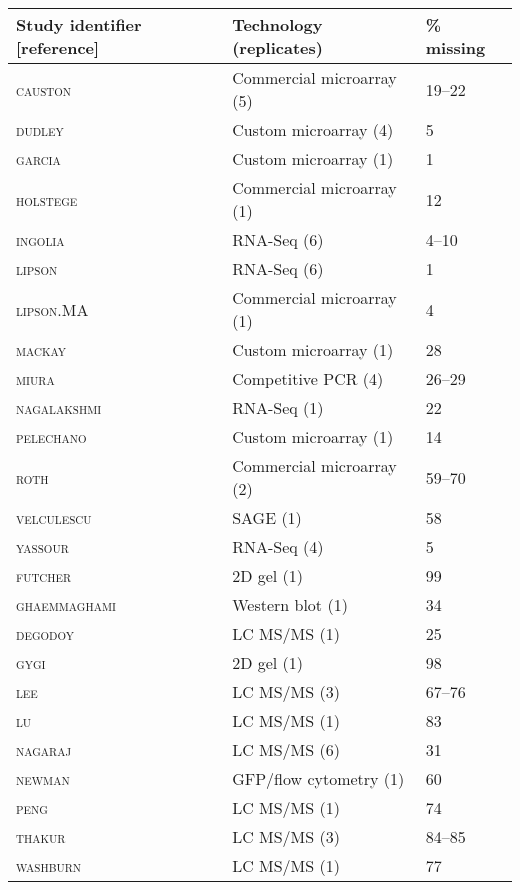 \begin{tabular}{lll}
Study identifier [reference]                    & Technology (replicates)   & \% missing\\
\hline
\textsc{causton} \cite{causton01}       & Commercial microarray (5) & 19--22 \\
\textsc{dudley}  \cite{dudley02}        & Custom microarray (4)     & 5      \\
\textsc{garcia} \cite{garciamartinez04} & Custom microarray (1\protect\footnotemark)     & 1      \\
\textsc{holstege} \cite{holstege98}     & Commercial microarray (1) & 12     \\
\textsc{ingolia} \cite{ingolia09,Ingolia2010}       & RNA-Seq (6)               & 4--10  \\
\textsc{lipson} \cite{lipson09}         & RNA-Seq (6)               & 1      \\
\textsc{lipson}.MA \cite{lipson09}      & Commercial microarray (1) & 4      \\
\textsc{mackay} \cite{mackay04}         & Custom microarray (1)     & 28     \\
\textsc{miura} \cite{miura08}           & Competitive PCR (4)       & 26--29 \\
\textsc{nagalakshmi} \cite{nagalakshmi08} & RNA-Seq (1)             & 22     \\
\textsc{pelechano} \cite{pelechano10}   & Custom microarray (1)     & 14     \\
\textsc{roth} \cite{roth98}             & Commercial microarray (2) & 59--70 \\
\textsc{velculescu} \cite{velculescu97} & SAGE (1)                  & 58     \\
\textsc{yassour} \cite{yassour09}       & RNA-Seq (4)               & 5      \\
\hline
\textsc{futcher} \cite{futcher99}       & 2D gel (1)                & 99     \\
\textsc{ghaemmaghami} \cite{ghaemmaghami03} & Western blot (1)      & 34     \\
\textsc{degodoy} \cite{degodoy08}       & LC MS/MS (1)              & 25     \\
\textsc{gygi} \cite{gygi99}             & 2D gel (1)                & 98     \\
\textsc{lee} \cite{lee11}               & LC MS/MS (3)              & 67--76 \\
\textsc{lu} \cite{lu07}                 & LC MS/MS (1)              & 83     \\
\textsc{nagaraj} \cite{nagaraj12}       & LC MS/MS (6)              & 31     \\
\textsc{newman} \cite{newman06}         & GFP/flow cytometry (1)    & 60     \\
\textsc{peng} \cite{peng03}             & LC MS/MS (1)              & 74     \\
\textsc{thakur} \cite{thakur11}         & LC MS/MS (3)              & 84--85 \\
\textsc{washburn} \cite{washburn01}     & LC MS/MS (1)              & 77     \\
\hline
\end{tabular}
